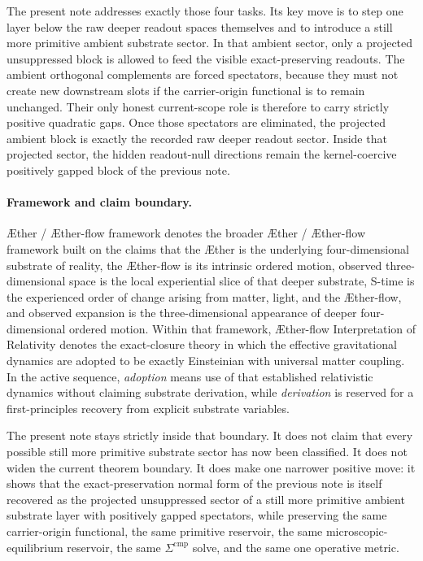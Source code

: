 \documentclass[11pt]{article}
\newcommand{\Aether}{\AE{}ther}
\newcommand{\Aflow}{\AE{}ther-flow}
\newcommand{\TheoryName}{\Aflow{} Interpretation of Relativity}
\newcommand{\TheoryProgram}{\Aether{} / \Aflow{} framework}
\begin{document}
The present note addresses exactly those four tasks. Its key move is to step one layer below the raw deeper readout spaces themselves and to introduce a still more primitive ambient substrate sector. In that ambient sector, only a projected unsuppressed block is allowed to feed the visible exact-preserving readouts. The ambient orthogonal complements are forced spectators, because they must not create new downstream slots if the carrier-origin functional is to remain unchanged. Their only honest current-scope role is therefore to carry strictly positive quadratic gaps. Once those spectators are eliminated, the projected ambient block is exactly the recorded raw deeper readout sector. Inside that projected sector, the hidden readout-null directions remain the kernel-coercive positively gapped block of the previous note.

\paragraph{Framework and claim boundary.}
\TheoryProgram{} denotes the broader \Aether{} / \Aflow{} framework built on the claims that the \Aether{} is the underlying four-dimensional substrate of reality, the \Aflow{} is its intrinsic ordered motion, observed three-dimensional space is the local experiential slice of that deeper substrate, S-time is the experienced order of change arising from matter, light, and the \Aflow{}, and observed expansion is the three-dimensional appearance of deeper four-dimensional ordered motion. Within that framework, \TheoryName{} denotes the exact-closure theory in which the effective gravitational dynamics are adopted to be exactly Einsteinian with universal matter coupling. In the active sequence, \emph{adoption} means use of that established relativistic dynamics without claiming substrate derivation, while \emph{derivation} is reserved for a first-principles recovery from explicit substrate variables.

The present note stays strictly inside that boundary. It does not claim that every possible still more primitive substrate sector has now been classified. It does not widen the current theorem boundary. It does make one narrower positive move: it shows that the exact-preservation normal form of the previous note is itself recovered as the projected unsuppressed sector of a still more primitive ambient substrate layer with positively gapped spectators, while preserving the same carrier-origin functional, the same primitive reservoir, the same microscopic-equilibrium reservoir, the same \(\Sigma^{\mathrm{cmp}}\) solve, and the same one operative metric.
\end{document}
